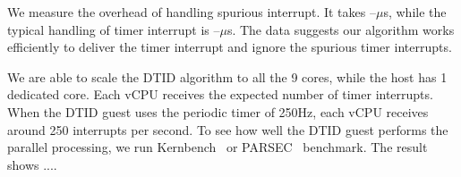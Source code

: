 We measure the overhead of handling spurious interrupt. It
takes --$\mu$s, while the typical handling of timer interrupt
is --$\mu$s. The data suggests our algorithm works efficiently
to deliver the timer interrupt and ignore the spurious timer
interrupts.

We are able to scale the DTID algorithm to all the 9 cores,
while the host has 1 dedicated core. Each vCPU receives the
expected number of timer interrupts. When the DTID guest uses
the periodic timer of 250Hz, each vCPU receives around 250
interrupts per second. To see how well the DTID guest performs
the parallel processing, we run Kernbench~\cite{kernbench} or
PARSEC~\cite{bienia:2008} benchmark. The result shows ....
